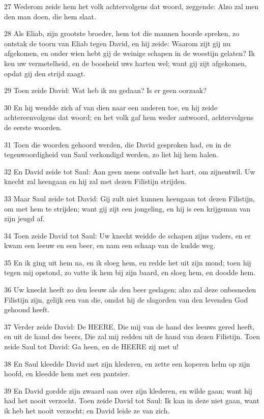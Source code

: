 \par 27 Wederom zeide hem het volk achtervolgens dat woord, zeggende: Alzo zal men den man doen, die hem slaat.
\par 28 Als Eliab, zijn grootste broeder, hem tot die mannen hoorde spreken, zo ontstak de toorn van Eliab tegen David, en hij zeide: Waarom zijt gij nu afgekomen, en onder wien hebt gij de weinige schapen in de woestijn gelaten? Ik ken uw vermetelheid, en de boosheid uws harten wel; want gij zijt afgekomen, opdat gij den strijd zaagt.
\par 29 Toen zeide David: Wat heb ik nu gedaan? Is er geen oorzaak?
\par 30 En hij wendde zich af van dien naar een anderen toe, en hij zeide achtereenvolgens dat woord; en het volk gaf hem weder antwoord, achtervolgens de eerste woorden.
\par 31 Toen die woorden gehoord werden, die David gesproken had, en in de tegenwoordigheid van Saul verkondigd werden, zo liet hij hem halen.
\par 32 En David zeide tot Saul: Aan geen mens ontvalle het hart, om zijnentwil. Uw knecht zal heengaan en hij zal met dezen Filistijn strijden.
\par 33 Maar Saul zeide tot David: Gij zult niet kunnen heengaan tot dezen Filistijn, om met hem te strijden; want gij zijt een jongeling, en hij is een krijgsman van zijn jeugd af.
\par 34 Toen zeide David tot Saul: Uw knecht weidde de schapen zijns vaders, en er kwam een leeuw en een beer, en nam een schaap van de kudde weg.
\par 35 En ik ging uit hem na, en ik sloeg hem, en redde het uit zijn mond; toen hij tegen mij opstond, zo vatte ik hem bij zijn baard, en sloeg hem, en doodde hem.
\par 36 Uw knecht heeft zo den leeuw als den beer geslagen; alzo zal deze onbesneden Filistijn zijn, gelijk een van die, omdat hij de slagorden van den levenden God gehoond heeft.
\par 37 Verder zeide David: De HEERE, Die mij van de hand des leeuws gered heeft, en uit de hand des beers, Die zal mij redden uit de hand van dezen Filistijn. Toen zeide Saul tot David: Ga heen, en de HEERE zij met u!
\par 38 En Saul kleedde David met zijn klederen, en zette een koperen helm op zijn hoofd, en kleedde hem met een pantsier.
\par 39 En David gordde zijn zwaard aan over zijn klederen, en wilde gaan; want hij had het nooit verzocht. Toen zeide David tot Saul: Ik kan in deze niet gaan, want ik heb het nooit verzocht; en David leide ze van zich.
